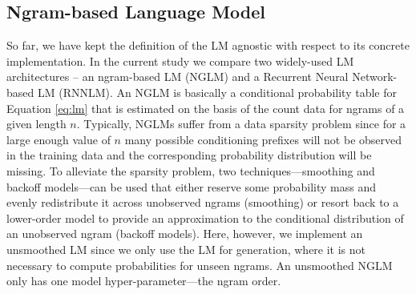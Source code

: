 \documentclass[11pt]{article}
\begin{document}
\subsection{Ngram-based Language Model}
So far, we have kept the definition of the LM agnostic with respect to its concrete implementation.
In the current study we compare two widely-used LM architectures -- an ngram-based LM (NGLM) and a
Recurrent Neural Network-based LM (RNNLM). An NGLM is basically a conditional probability table for Equation \ref{eq:lm} that is estimated
on the basis of the count data for ngrams of a given length $n$.
Typically, NGLMs suffer from a data sparsity problem since for a large enough value of $n$
many possible conditioning prefixes will not be observed in the training data and the
corresponding probability distribution will be missing.
To alleviate the sparsity problem, two techniques---smoothing and backoff models---can be
used that either reserve some probability mass and evenly redistribute it 
across unobserved
ngrams (smoothing) or resort back to a lower-order model to provide an approximation to
the conditional distribution of an unobserved ngram (backoff models).
Here, however, we implement an unsmoothed LM since we only use the LM for generation,
where it is not necessary to compute probabilities for unseen ngrams. 
An unsmoothed NGLM only has one model hyper-parameter---the ngram order.
\end{document}
